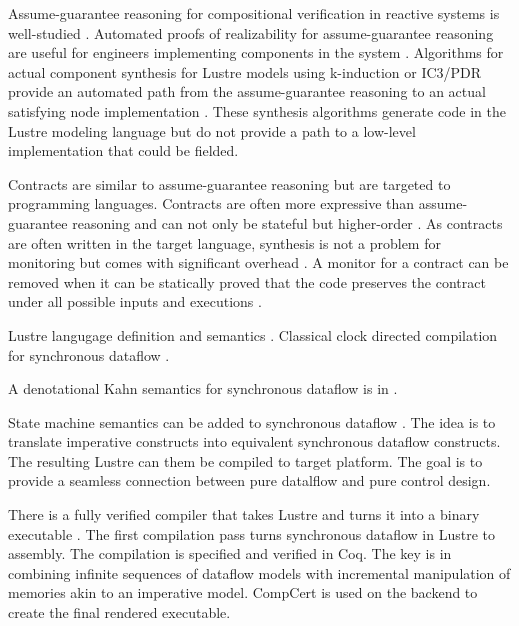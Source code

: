 Assume-guarantee reasoning for compositional verification in reactive systems is well-studied \cite{10.1007/978-3-642-28891-3_13, composition1, 10.1145/2658982.2527272, 10.1007/978-3-319-17524-9_7}. Automated proofs of realizability for assume-guarantee reasoning are useful for engineers implementing components in the system \cite{10.1007/978-3-319-17524-9_13, 10.1007/978-3-319-29613-5_7}. Algorithms for actual component synthesis for Lustre models using k-induction or IC3/PDR provide an automated path from the assume-guarantee reasoning to an actual satisfying node implementation \cite{katis2017synthesis, 10.1007/978-3-319-89963-3_10}. These synthesis algorithms generate code in the Lustre modeling language but do not provide a path to a low-level implementation that could be fielded.

Contracts are similar to assume-guarantee reasoning but are targeted to programming languages. Contracts are often more expressive than assume-guarantee reasoning and can not only be stateful but higher-order \cite{10.1145/583852.581484}. As contracts are often written in the target language, synthesis is not a problem for monitoring but comes with significant overhead \cite{10.1007/978-3-642-28869-2_11}. A monitor for a contract can be removed when it can be statically proved that the code preserves the contract under all possible inputs and executions \cite{10.1145/3158139}.

Lustre langugage definition and semantics \cite{10.1145/41625.41641,97300}. Classical clock directed compilation for synchronous dataflow \cite{10.1145/1379023.1375674,10.1145/2345141.2248426}.

A denotational Kahn semantics for synchronous dataflow is in \cite{10.1007/978-3-540-45212-6_10}.

State machine semantics can be added to synchronous dataflow \cite{10.1145/1086228.1086261}. The idea is to translate imperative constructs into equivalent synchronous dataflow constructs. The resulting Lustre can them be compiled to target platform. The goal is to provide a seamless connection between pure datalflow and pure control design.

There is a fully verified compiler that takes Lustre and turns it into a binary executable \cite{10.1145/3140587.3062358}. The first compilation pass turns synchronous dataflow in Lustre to assembly. The compilation is specified and verified in Coq. The key is in combining infinite sequences of dataflow models with incremental manipulation of memories akin to an imperative model. CompCert is used on the backend to create the final rendered executable.